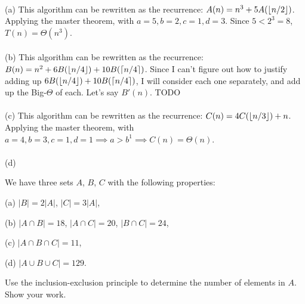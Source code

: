 \documentclass[11pt]{article}
\begin{document}
\begin{solution}
   \\
	(a) This algorithm can be rewritten as the recurrence: $A(n) = n^3 + 5A({\left\lfloor n/2\right\rfloor})$. Applying the master theorem, with $a = 5, b=2, c=1, d=3$. Since $5 < 2^3=8$, $T(n) = \Theta(n^3)$.
   \\\\
   (b) This algorithm can be rewritten as the recurrence: $B(n) = n^2 + 6B({\left\lfloor n/4\right\rfloor}) + 10B(\lceil{n/4}\rceil)$. Since I can't figure out how to justify adding up $6B({\left\lfloor n/4\right\rfloor}) + 10B(\lceil{n/4}\rceil)$, I will consider each one separately, and add up the Big-$\Theta$ of each. Let's say $B'(n) $. TODO
   \\\\
   (c) This algorithm can be rewritten as the recurrence: $C(n) = 4C({\left\lfloor n/3\right\rfloor}) + n$. Applying the master theorem, with $a=4, b=3, c=1, d=1 \implies a > b^1 \implies C(n) = \Theta(n)$.
   \\\\
   (d) 
\end{solution}


\newpage
\vspace{0.1in}
\begin{problem}
We have three sets $A$, $B$, $C$ with the following properties:

\begin{description}

\item{(a)}  $|B| = 2|A|$, $|C| = 3|A|$, 


\item{(b)} $|A\cap B| = 18$,
        $|A\cap C| = 20$,
        $|B\cap C| = 24$,

\item{(c)}
$|A\cap B\cap C| = 11$,

\item{(d)}
$|A\cup B\cup C| = 129$.

\end{description}

\noindent Use the inclusion-exclusion principle to determine the number of elements in $A$. 
Show your work.
\end{problem}


\end{document}
